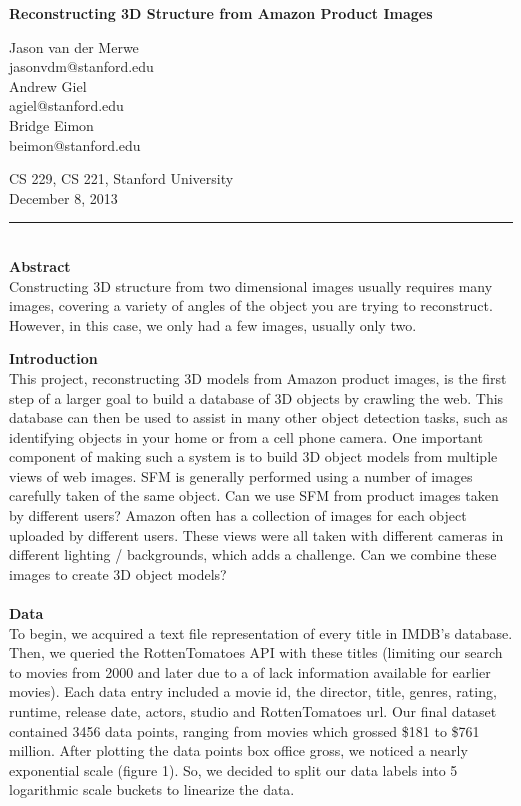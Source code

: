 \documentclass[12pt]{article}
\begin{document}
\begin{center}

{\Large \textbf{Reconstructing 3D Structure from Amazon Product Images}}

\begin{multicols}{3}
Jason van der Merwe\\
jasonvdm@stanford.edu\\
\columnbreak
Andrew Giel\\
agiel@stanford.edu\\
\columnbreak
Bridge Eimon\\
beimon@stanford.edu\\
\end{multicols}
CS 229, CS 221, Stanford University\\
December 8, 2013\\
\end{center}
\noindent\rule{16.5cm}{0.4pt}\\
{\large \textbf{Abstract}}\\
Constructing 3D structure from two dimensional images usually requires many images, covering a variety of angles of the object you are trying to reconstruct. However, in this case, we only had a few images, usually only two.
\begin{multicols}{2}
{\noindent \large \textbf{Introduction}}\\
This project, reconstructing 3D models from Amazon product images, is the first step of a larger goal to build a database of 3D objects by crawling the web.  This database can then be used to assist in many other object detection tasks, such as identifying objects in your home or from a cell phone camera.  One important component of making such a system is to build 3D object models from multiple views of web images. SFM is generally performed using a number of images carefully taken of the same object.  Can we use SFM from product images taken by different users?  Amazon often has a collection of images for each object uploaded by different users.  These views were all taken with different cameras in different lighting / backgrounds, which adds a challenge.  Can we combine these images to create 3D object models?
\\\\
{\large \textbf{Data}}\\
To begin, we acquired a text file representation of every title in IMDB’s database. Then, we queried the RottenTomatoes API with these titles (limiting our search to movies from 2000 and later due to a of lack information available for earlier movies). Each data entry included a movie id, the director, title, genres, rating, runtime, release date, actors, studio and RottenTomatoes url. Our final dataset contained 3456 data points, ranging from movies which grossed \$181 to \$761 million. After plotting the data points box office gross, we noticed a nearly exponential scale (figure 1). So, we decided to split our data labels into 5 logarithmic scale buckets to linearize the data.



\end{multicols}
\end{document}
